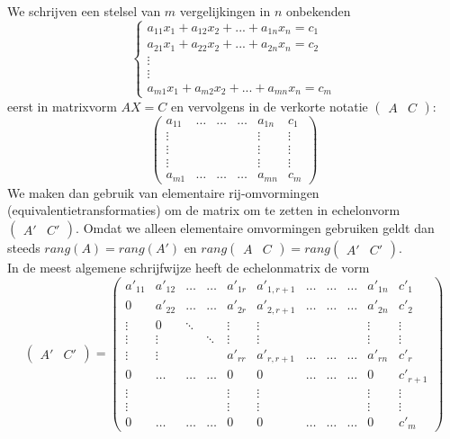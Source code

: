 We schrijven een stelsel van $m$ vergelijkingen in $n$ onbekenden 
\[ 
\left\{ \begin{array}{l}
a_{11} x_1 + a_{12} x_2 + ... + a_{1n} x_n = c_1 \\
a_{21} x_1 + a_{22} x_2 + ... + a_{2n} x_n = c_2 \\
\vdots \\ \vdots \\
a_{m1} x_1 + a_{m2} x_2 + ... + a_{mn} x_n = c_m
\end{array}
\right.
\]
eerst in matrixvorm $AX=C$ en vervolgens in de verkorte notatie $\left( \begin{array}{c|c} A & C \end{array} \right)$:
\[
\left( 
\begin{array}{ccccc|c}
a_{11} & \ldots & \ldots & \ldots & a_{1n} & c_1 \\ \vdots & & & & \vdots & \vdots \\ \vdots & & & & \vdots & \vdots \\ \vdots & & & & \vdots & \vdots \\ a_{m1} & \ldots & \ldots & \ldots & a_{mn} & c_m
\end{array} 
\right)
\]
We maken dan gebruik van elementaire rij-omvormingen (equivalentietransformaties) om de matrix om te zetten in echelonvorm $\left( \begin{array}{c|c} A' & C' \end{array} \right)$. Omdat we alleen elementaire omvormingen gebruiken geldt dan steeds $rang(A)=rang(A')$ en $rang \left( \begin{array}{c|c} A & C \end{array} \right) = rang \left( \begin{array}{c|c} A' & C' \end{array} \right)$.\\
In de meest algemene schrijfwijze heeft de echelonmatrix de vorm
\[ \left( \begin{array}{c|c} A' & C' \end{array} \right) = 
\left(
\begin{array}{cccccccccc|c}
a'_{11} & a'_{12} & \ldots & \ldots & a'_{1r} & a'_{1,r+1} & \ldots & \ldots & \ldots & a'_{1n} & c'_{1} \\
0 & a'_{22} & \ldots & \ldots & a'_{2r} & a'_{2,r+1} & \ldots & \ldots & \ldots & a'_{2n} & c'_{2} \\
\vdots & 0 & \ddots &  & \vdots & \vdots & & & & \vdots & \vdots \\
\vdots & \vdots & & \ddots & \vdots & \vdots & & & & \vdots & \vdots \\
\vdots & \vdots & & & a'_{rr} & a'_{r,r+1} & \ldots & \ldots & \ldots & a'_{rn} & c'_{r} \\
0 & \ldots & \ldots & \ldots & 0 & 0 & \ldots & \ldots & \ldots & 0 & c'_{r+1} \\
\vdots & & & & \vdots & \vdots & & & & \vdots & \vdots \\
\vdots & & & & \vdots & \vdots & & & & \vdots & \vdots \\
0 & \ldots & \ldots & \ldots & 0 & 0 & \ldots & \ldots & \ldots & 0 & c'_{m} 
\end{array} 
\right) 
\]

